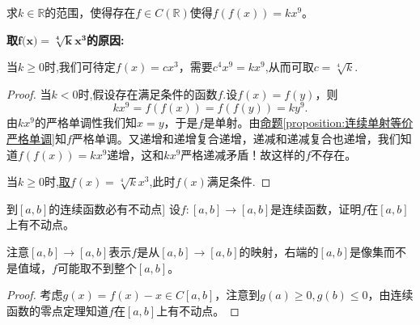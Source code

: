 \documentclass[../../main.tex]{subfiles}
\begin{document}
\begin{example}
求\(k\in\mathbb{R}\)的范围，使得存在\(f\in C(\mathbb{R})\)使得\(f(f(x)) = kx^{9}\)。
\end{example}
\begin{note}
\hypertarget{取这个函数的原因}{\textbf{取$\boldsymbol{f}\mathbf{(}\boldsymbol{x}\mathbf{)}=\sqrt[\mathbf{4}]{\boldsymbol{k}}\boldsymbol{x}^{\mathbf{3}}$的原因:}}当\(k\geqslant0\)时,我们可待定\(f(x)=cx^{3}\)，需要\(c^{4}x^{9}=kx^{9}\),从而可取\(c = \sqrt[4]{k}\).
\end{note}
\begin{proof}
当$k<0$时,假设存在满足条件的函数$f$.设\(f(x)=f(y)\)，则
\[
kx^{9}=f(f(x)) = f(f(y)) = ky^{9}.
\]
由\(kx^{9}\)的严格单调性我们知\(x = y\)，于是\(f\)是单射。由\hyperref[proposition:连续单射等价严格单调]{命题\ref{proposition:连续单射等价严格单调}}知\(f\)严格单调。又递增和递增复合递增，递减和递减复合也递增，我们知道\(f(f(x)) = kx^{9}\)递增，这和\(kx^{9}\)严格递减矛盾！故这样的\(f\)不存在。

当\(k\geqslant0\)时,\hyperlink{取这个函数的原因}{取$f(x)=\sqrt[4]{k}x^3$},此时$f(x)$满足条件.

\end{proof}

\begin{proposition}[\([a,b]\)到\([a,b]\)的连续函数必有不动点]\label{proposition:[a,b]到[a,b]的连续函数必有不动点}
设\(f:[a,b]\to[a,b]\)是连续函数，证明\(f\)在\([a,b]\)上有不动点。
\end{proposition}
\begin{note}
注意\([a,b]\to[a,b]\)表示\(f\)是从\([a,b]\to[a,b]\)的映射，右端的\([a,b]\)是像集而不是值域，\(f\)可能取不到整个\([a,b]\)。
\end{note}
\begin{proof}
考虑\(g(x)=f(x)-x\in C[a,b]\)，注意到\(g(a)\geqslant0,g(b)\leqslant0\)，由连续函数的零点定理知道\(f\)在\([a,b]\)上有不动点。

\end{proof}
\end{document}
